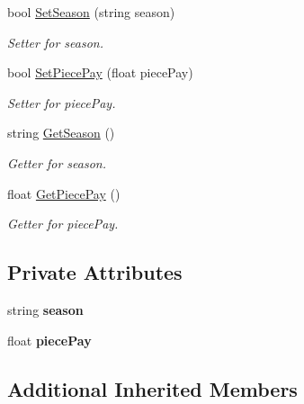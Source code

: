 \begin{DoxyCompactItemize}
bool \hyperlink{class_all_employees_1_1_seasonal_employee_a3cefc2899365780dd013b990ef46326c}{Set\+Season} (string season)
\begin{DoxyCompactList}\small\item\em Setter for season. \end{DoxyCompactList}\item 
bool \hyperlink{class_all_employees_1_1_seasonal_employee_a983e9f6a2a1fd71ed056d8b50d787e88}{Set\+Piece\+Pay} (float piece\+Pay)
\begin{DoxyCompactList}\small\item\em Setter for piece\+Pay. \end{DoxyCompactList}\item 
string \hyperlink{class_all_employees_1_1_seasonal_employee_a189a882ddc11648f3df82e5c0acd5522}{Get\+Season} ()
\begin{DoxyCompactList}\small\item\em Getter for season. \end{DoxyCompactList}\item 
float \hyperlink{class_all_employees_1_1_seasonal_employee_ae7836e968d20baba7327577807d36aa7}{Get\+Piece\+Pay} ()
\begin{DoxyCompactList}\small\item\em Getter for piece\+Pay. \end{DoxyCompactList}\end{DoxyCompactItemize}
\subsection*{Private Attributes}
\begin{DoxyCompactItemize}
\item 
\hypertarget{class_all_employees_1_1_seasonal_employee_a7615ccd677faed6b26afa27aadd7a71e}{}string {\bfseries season}\label{class_all_employees_1_1_seasonal_employee_a7615ccd677faed6b26afa27aadd7a71e}

\item 
\hypertarget{class_all_employees_1_1_seasonal_employee_afc65d49c016c4510e123b93c9570b639}{}float {\bfseries piece\+Pay}\label{class_all_employees_1_1_seasonal_employee_afc65d49c016c4510e123b93c9570b639}

\end{DoxyCompactItemize}
\subsection*{Additional Inherited Members}


